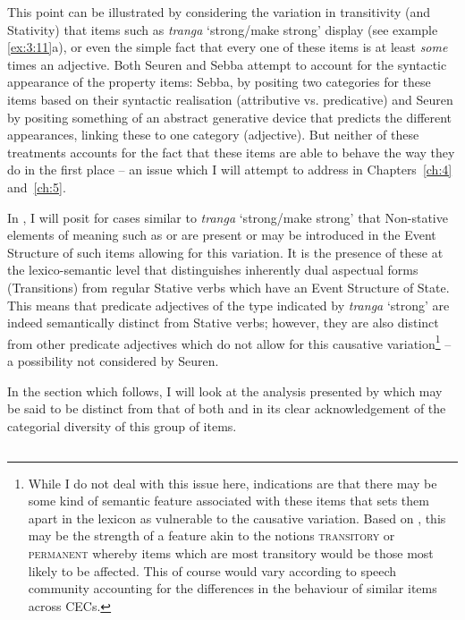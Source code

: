 This point can be illustrated by considering the variation in
transitivity (and Stativity) that items such as \textit{tranga}
`strong\slash make strong' display (see example \ref{ex:3:11}a), or even the simple
fact that every one of these items is at least \textit{some} times an
adjective.  Both Seuren and Sebba attempt to account for the syntactic
appearance of the property items: Sebba, by positing two categories
for these items based on their syntactic realisation (attributive
vs. predicative) and Seuren by positing something of an abstract
generative device that predicts the different appearances, linking
these to one category (adjective).  But neither of these treatments
accounts for the fact that these items are able to behave the way they
do in the first place -- an issue which I will attempt to address in
Chapters~\ref{ch:4} and~\ref{ch:5}.

In , I will posit for cases similar to
\textit{tranga} `strong\slash make strong' that Non-stative elements of
{\textup{meaning}} such as \CAUSE or \BECOME are present or may be
introduced in the Event Structure of such items allowing for this
variation.  It is the presence of these at the lexico-semantic level
that distinguishes inherently dual aspectual forms (Transitions) from
regular Stative verbs which have an Event Structure of State.  This
means that predicate adjectives of the type indicated by
\textit{tranga} `strong' are indeed semantically distinct from Stative
verbs; however, they are also distinct from other predicate adjectives
which do not allow for this causative variation\footnote{While I do
  not deal with this issue here, indications are that there may be
  some kind of semantic feature associated with these items that sets
  them apart in the lexicon as vulnerable to the causative
  variation. Based on \citet{Winford1993}, this may be the strength of
  a feature akin to the notions \textsc{transitory} or \textsc{permanent} whereby items
  which are most transitory would be those most likely to be
  affected. This of course would vary according to speech community
  accounting for the differences in the behaviour of similar items
  across CECs.} – a possibility not considered by Seuren.

In the section which follows, I will look at the analysis presented by
\citet{Kouwenberg1996} which may be said to be distinct from that of
both \citet{Sebba1986} and \citet{Seuren1986} in its clear acknowledgement
of the categorial diversity of this group of items.

\subsection{\citet{Kouwenberg1996}}\label{sec:3.1.2}

